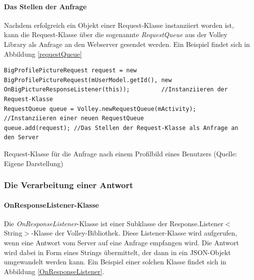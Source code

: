 \documentclass[../main.tex]{subfiles}
\begin{document}
	\paragraph{Das Stellen der Anfrage}
	Nachdem erfolgreich ein Objekt einer Request-Klasse instanziiert worden ist, kann die Request-Klasse über die sogenannte \emph{RequestQueue} aus der Volley Library als Anfrage an den Webserver gesendet werden. Ein Beispiel findet sich in Abbildung \ref{requestQueue}
	
\begin{code}
	\begin{center}
		\begin{verbatim}
BigProfilePictureRequest request = new BigProfilePictureRequest(mUserModel.getId(), new OnBigPictureResponseListener(this)); 		 //Instanziieren der Request-Klasse
RequestQueue queue = Volley.newRequestQueue(mActivity); //Instanziieren einer neuen RequestQueue
queue.add(request); //Das Stellen der Request-Klasse als Anfrage an den Server
		\end{verbatim}
		\caption{Request-Klasse für die Anfrage nach einem Profilbild eines Benutzers (Quelle: Eigene Darstellung)}
		\label{requestQueue}
	\end{center}
\end{code}	
	
	\subsubsection{Die Verarbeitung einer Antwort} \label{responseListener}
	\paragraph{OnResponseListener-Klasse} Die \emph{OnResponseListener}-Klasse ist einer Subklasse der Response.Listener$<$String$>$-Klasse der Volley-Bibliothek. Diese Listener-Klasse wird aufgerufen, wenn eine Antwort vom Server auf eine Anfrage empfangen wird. Die Antwort wird dabei in Form eines Strings übermittelt, der dann in ein JSON-Objekt umgewandelt werden kann. Ein Beispiel einer solchen Klasse findet sich in Abbildung \ref{OnResponseListener}.
	
\end{document}
